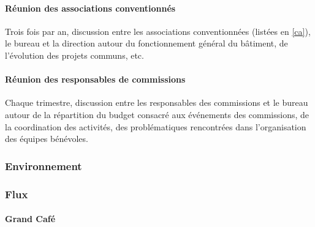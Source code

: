 \paragraph{Réunion des associations conventionnés} Trois fois par an,
discussion entre les associations conventionnées (listées en \ref{ca}),
le bureau et la direction autour du fonctionnement général du bâtiment,
de l'évolution des projets communs, etc.

\paragraph{Réunion des responsables de commissions} Chaque trimestre,
discussion entre les responsables des commissions et le bureau
autour de la répartition du budget consacré aux événements des commissions,
de la coordination des activités, des problématiques rencontrées dans
l'organisation des équipes bénévoles.

\subsubsection{Environnement}
\subsubsection{Flux}
\paragraph{Grand Café}
